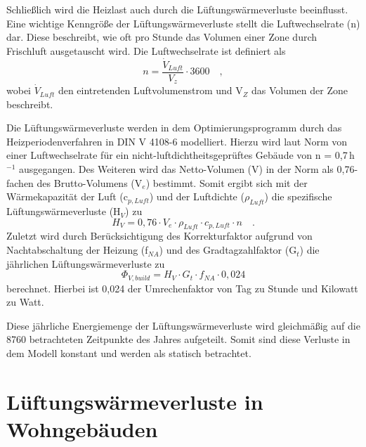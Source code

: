Schließlich wird die Heizlast auch durch die Lüftungswärmeverluste beeinflusst.
Eine wichtige Kenngröße der Lüftungswärmeverluste stellt die Luftwechselrate (n) dar.
Diese beschreibt, wie oft pro Stunde das Volumen einer Zone durch Frischluft ausgetauscht wird.
Die Luftwechselrate ist definiert als
\begin{equation}
\label{eq:Gleichun330}
n = \frac{\Dot{V}_{Luft}}{V_z} \cdot 3600 \quad,
\end{equation}
wobei \(\Dot{V}_{Luft}\) den eintretenden Luftvolumenstrom und V\(_Z\) das Volumen der Zone beschreibt.

Die Lüftungswärmeverluste werden in dem Optimierungsprogramm durch das Heizperiodenverfahren in DIN V 4108-6 \cite{DeutschesInstitutfurNormunge.V..Juni2003} modelliert.
Hierzu wird laut Norm von einer Luftwechselrate für ein nicht-luftdichtheitsgeprüftes Gebäude von n = 0,7\,h\(^{-1}\) ausgegangen. 
Des Weiteren wird das Netto-Volumen (V) in der Norm als 0,76-fachen des Brutto-Volumens (V\(_e\)) bestimmt.
Somit ergibt sich mit der Wärmekapazität der Luft (c\(_{p, Luft}\)) und der Luftdichte (\(\rho_{Luft}\)) die spezifische Lüftungswärmeverluste (H\(_V\)) zu
\begin{equation}
\label{eq:Gleichung328}
H_V = 0,76 \cdot V_e \cdot \rho_{Luft} \cdot c_{p, Luft} \cdot n \quad \text{.}
\end{equation}
Zuletzt wird durch Berücksichtigung des Korrekturfaktor aufgrund von Nachtabschaltung der Heizung (f\(_{NA}\)) und des Gradtagzahlfaktor (G\(_t\)) die jährlichen Lüftungswärmeverluste zu
\begin{equation}
\label{eq:Gleichung329}
\Phi_{V, build} = H_V \cdot G_t \cdot f_{NA} \cdot 0,024
\end{equation}
berechnet.
Hierbei ist 0,024 der Umrechenfaktor von Tag zu Stunde und Kilowatt zu Watt.

Diese jährliche Energiemenge der Lüftungswärmeverluste wird gleichmäßig auf die 8760 betrachteten Zeitpunkte des Jahres aufgeteilt.
Somit sind diese Verluste in dem Modell konstant und werden als statisch betrachtet.

\newpage

\section{Lüftungswärmeverluste in Wohngebäuden}
\label{sec:Sektion 33}

